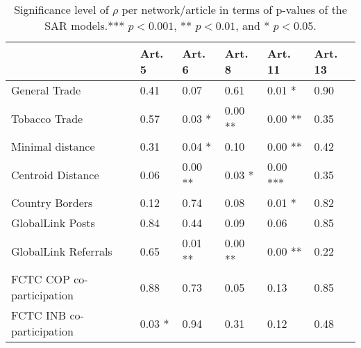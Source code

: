 \begin{table}[ht]
\centering
\begin{tabular}{llllll}
  \toprule
 & Art. 5 & Art. 6 & Art. 8 & Art. 11 & Art. 13 \\ 
  \midrule
General Trade & 0.41   & 0.07   & 0.61   & 0.01 * & 0.90   \\ 
  Tobacco Trade & 0.57   & 0.03 * & 0.00 ** & 0.00 ** & 0.35   \\ 
  Minimal distance & 0.31   & 0.04 * & 0.10   & 0.00 ** & 0.42   \\ 
  Centroid Distance & 0.06   & 0.00 ** & 0.03 * & 0.00 *** & 0.35   \\ 
  Country Borders & 0.12   & 0.74   & 0.08   & 0.01 * & 0.82   \\ 
  GlobalLink Posts & 0.84   & 0.44   & 0.09   & 0.06   & 0.85   \\ 
  GlobalLink Referrals & 0.65   & 0.01 ** & 0.00 ** & 0.00 ** & 0.22   \\ 
  FCTC COP co-participation & 0.88   & 0.73   & 0.05   & 0.13   & 0.85   \\ 
  FCTC INB co-participation & 0.03 * & 0.94   & 0.31   & 0.12   & 0.48   \\ 
   \bottomrule
\end{tabular}
\caption{Significance level of $\rho$ per network/article in terms of p-values of the SAR models.*** $p < 0.001$, ** $p < 0.01$, and * $p < 0.05$.} 
\end{table}
